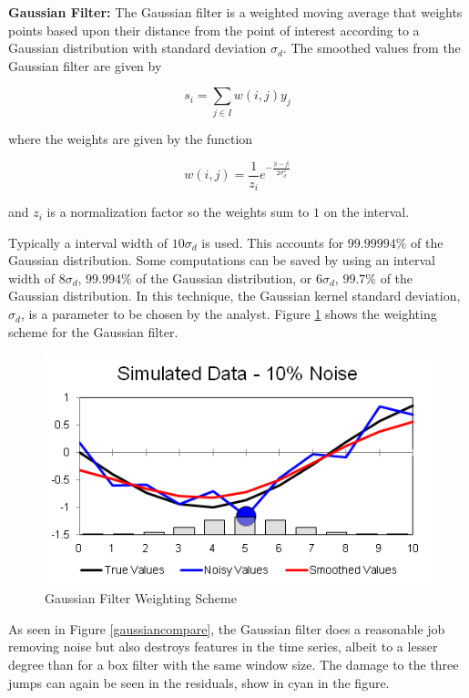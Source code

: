 \documentclass[11pt]{article}
\newcommand{\vs}{\vspace{0.1in}}
\theoremstyle{definition}
\begin{document}
\vs
\noindent
\textbf{Gaussian Filter:} The Gaussian filter is a weighted moving average that weights points based upon their distance from the point of interest according to a Gaussian distribution with standard deviation $\sigma_d$. The smoothed values from the Gaussian filter are given by

\begin{displaymath}
s_i = \sum _{j \in I} w \left(i, j \right) y_j
\end{displaymath}

\noindent
where the weights are given by the function

\begin{displaymath}
w\left(i, j\right) = \frac{1}{z_i} e^{-\frac{\lvert i - j \rvert}{2 \sigma_d^2}}
\end{displaymath}

\noindent
and $z_i$ is a normalization factor so the weights sum to $1$ on the interval.

Typically a interval width of $10 \sigma_d$ is used. This accounts for $99.99994\%$ of the Gaussian distribution. Some computations can be saved by using an interval width of $8 \sigma_d$, $99.994\%$ of the Gaussian distribution, or $6 \sigma_d$, $99.7\%$ of the Gaussian distribution. In this technique, the Gaussian kernel standard deviation, $\sigma_d$, is a parameter to be chosen by the analyst. Figure \ref{gaussiandemo} shows the weighting scheme for the Gaussian filter.

\begin{figure}
\centering
\includegraphics[width = 0.65 \textwidth]{GaussianDemo.png}
\caption{Gaussian Filter Weighting Scheme}
\label{gaussiandemo}
\end{figure}

As seen in Figure \ref{gaussiancompare}, the Gaussian filter does a reasonable job removing noise but also destroys features in the time series, albeit to a lesser degree than for a box filter with the same window size. The damage to the three jumps can again be seen in the residuals, show in cyan in the figure.
\end{document}
